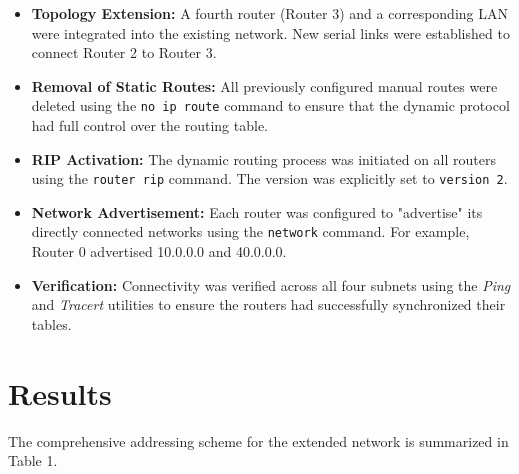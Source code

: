 \documentclass[11pt]{article}
\begin{document}
\begin{itemize}
    \item \textbf{Topology Extension:} A fourth router (Router 3) and a corresponding LAN were integrated into the existing network. New serial links were established to connect Router 2 to Router 3.
    \item \textbf{Removal of Static Routes:} All previously configured manual routes were deleted using the \texttt{no ip route} command to ensure that the dynamic protocol had full control over the routing table.
    \item \textbf{RIP Activation:} The dynamic routing process was initiated on all routers using the \texttt{router rip} command. The version was explicitly set to \texttt{version 2}.
    \item \textbf{Network Advertisement:} Each router was configured to "advertise" its directly connected networks using the \texttt{network} command. For example, Router 0 advertised 10.0.0.0 and 40.0.0.0.
    \item \textbf{Verification:} Connectivity was verified across all four subnets using the \textit{Ping} and \textit{Tracert} utilities to ensure the routers had successfully synchronized their tables.
\end{itemize}

\section{Results}
The comprehensive addressing scheme for the extended network is summarized in Table 1.
\end{document}
